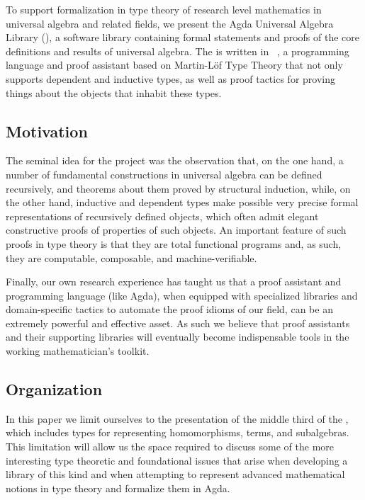 
To support formalization in type theory of research level mathematics in universal algebra and related fields, we present the Agda Universal Algebra Library (\agdaualib), a software library containing formal statements and proofs of the core definitions and results of universal algebra. 
The \ualib is written in \agda~\cite{Norell:2009}, a programming language and proof assistant based on Martin-L\"of Type Theory that not only supports dependent and inductive types, as well as proof tactics for proving things about the objects that inhabit these types.

\subsection{Motivation}\label{sec:motivation}
The seminal idea for the \agdaualib project was the observation that, on the one hand, a number of fundamental constructions in universal algebra can be defined recursively, and theorems about them proved by structural induction, while, on the other hand, inductive and dependent types make possible very precise formal representations of recursively defined objects, which often admit elegant constructive proofs of properties of such objects.  An important feature of such proofs in type theory is that they are total functional programs and, as such, they are computable, composable, and machine-verifiable.

Finally, our own research experience has taught us that a proof assistant and programming language (like Agda), when equipped with specialized libraries and domain-specific tactics to automate the proof idioms of our field, can be an extremely powerful and effective asset. As such we believe that proof assistants and their supporting libraries will eventually become indispensable tools in the working mathematician's toolkit.


\subsection{Organization}
\label{sec:contributions}

In this paper we limit ourselves to the presentation of the middle third of the \ualib, which includes types for representing homomorphisms, terms, and subalgebras. This limitation will allow us the space required to discuss some of the more interesting type theoretic and foundational issues that arise when developing a library of this kind and when attempting to represent advanced mathematical notions in type theory and formalize them in Agda.

